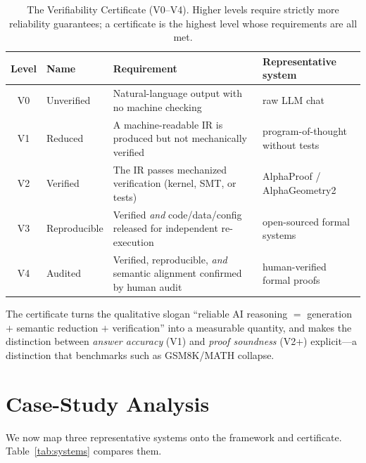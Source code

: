 \documentclass[11pt,a4paper]{article}
\theoremstyle{definition}
\theoremstyle{plain}
\begin{document}
\begin{table}[t]
\centering
\caption{The Verifiability Certificate (V0--V4). Higher levels require strictly more reliability
guarantees; a certificate is the highest level whose requirements are all met.}
\label{tab:certificate}
\small
\begin{tabular}{@{}c p{3.1cm} p{6.1cm} p{4.1cm}@{}}
\toprule
\textbf{Level} & \textbf{Name} & \textbf{Requirement} & \textbf{Representative system}\\
\midrule
V0 & Unverified & Natural-language output with no machine checking & raw LLM chat\\
V1 & Reduced & A machine-readable IR is produced but not mechanically verified & program-of-thought without
tests\\
V2 & Verified & The IR passes mechanized verification (kernel, SMT, or tests) & AlphaProof / AlphaGeometry2\\
V3 & Reproducible & Verified \emph{and} code/data/config released for independent re-execution & open-sourced
formal systems\\
V4 & Audited & Verified, reproducible, \emph{and} semantic alignment confirmed by human audit & human-verified
formal proofs\\
\bottomrule
\end{tabular}
\end{table}

The certificate turns the qualitative slogan ``reliable AI reasoning $=$ generation $+$ semantic
reduction $+$ verification'' into a measurable quantity, and makes the distinction between
\emph{answer accuracy} (V1) and \emph{proof soundness} (V2+) explicit---a distinction that benchmarks
such as GSM8K/MATH collapse.

\section{Case-Study Analysis}
\label{sec:analysis}

We now map three representative systems onto the framework and certificate. Table~\ref{tab:systems}
compares them.
\end{document}
